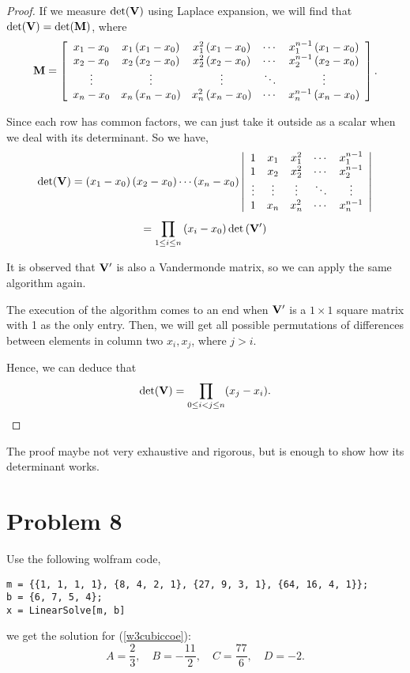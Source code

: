 \documentclass[12pt,a4paper]{article}
\begin{document}
\begin{solution}
\begin{remark}
\begin{proof}
If we measure \(\det(\mathbf{V})\) using Laplace expansion, we will find that \(\det(\mathbf{V}) = \det(\mathbf{M})\), where
\[
\mathbf{M}=\left[\begin{array}{ccccc}
x_1-x_0 & x_1\left(x_1-x_0\right) & x_1^2\left(x_1-x_0\right) & \cdots & x_1^{n-1}\left(x_1-x_0\right) \\
x_2-x_0 & x_2\left(x_2-x_0\right) & x_2^2\left(x_2-x_0\right) & \cdots & x_2^{n-1}\left(x_2-x_0\right) \\
\vdots & \vdots & \vdots & \ddots & \vdots \\
x_n-x_0 & x_n\left(x_n-x_0\right) & x_n^2\left(x_n-x_0\right) & \cdots & x_n^{n-1}\left(x_n-x_0\right)
\end{array}\right].
\]

Since each row has common factors, we can just take it outside as a scalar when we deal with its determinant. So we have,
\[
\operatorname{det}(\mathbf{V})=\left(x_1-x_0\right)\left(x_2-x_0\right) \cdots\left(x_n-x_0\right)\left|\begin{array}{ccccc}
1 & x_1 & x_1^2 & \cdots & x_1^{n-1} \\
1 & x_2 & x_2^2 & \cdots & x_2^{n-1} \\
\vdots & \vdots & \vdots & \ddots & \vdots \\
1 & x_n & x_n^2 & \cdots & x_n^{n-1}
\end{array}\right|
\]
\[
=\prod_{1 \leq i \leq n}\left(x_i-x_0\right) \operatorname{det}\left(\mathbf{V}^{\prime}\right)
\]

It is observed that \(\mathbf{V}^{\prime}\) is also a Vandermonde matrix, so we can apply the same algorithm again.

The execution of the algorithm comes to an end when \(\mathbf{V}^{\prime}\) is a \(1 \times 1\) square matrix with 1 as the only entry. Then, we will get all possible permutations of differences between elements in column two \(x_i, x_j\), where \(j > i\).

Hence, we can deduce that
\[
\det(\mathbf{V})=\prod_{0 \leq i < j \leq n}(x_j - x_i).
\]
\end{proof}
\begin{note}
    The proof maybe not very exhaustive and rigorous, but is enough to show how its determinant works.
\end{note}
\end{remark}
\end{solution}

\section*{Problem 8}
\begin{solution}
Use the following wolfram code,
\begin{lstlisting}
m = {{1, 1, 1, 1}, {8, 4, 2, 1}, {27, 9, 3, 1}, {64, 16, 4, 1}};
b = {6, 7, 5, 4};
x = LinearSolve[m, b]
\end{lstlisting}

we get the solution for (\ref{w3cubiccoe}):
$$
A=\frac{2}{3}, \quad B=-\frac{11}{2}, \quad C=\frac{77}{6}, \quad D=-2 .
$$
\end{solution}
\end{document}
